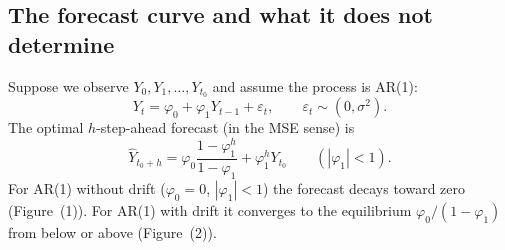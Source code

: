 \documentclass[a4paper,oneside,12pt]{extarticle}
\theoremstyle{plain}
\theoremstyle{definition}
\theoremstyle{remark}
\newcommand*{\ve}{\varepsilon}
\begin{document}
\subsection{The forecast curve and what it does not determine}

Suppose we observe $Y_0, Y_1, \ldots, Y_{t_0}$ and assume the process is
AR(1):
\[
  Y_t = \varphi_0 + \varphi_1 Y_{t-1} + \ve_t, \qquad \ve_t \sim (0, \sigma^2).
\]
The optimal $h$-step-ahead forecast (in the MSE sense) is
\begin{equation}
\label{eq:ar1_forecast}
\hat Y_{t_0+h} = \varphi_0 \frac{1-\varphi_1^h}{1-\varphi_1} + \varphi_1^h Y_{t_0}
  \qquad (|\varphi_1| < 1).
\end{equation}
For AR(1) without drift ($\varphi_0 = 0$, $|\varphi_1|<1$) the forecast
decays toward zero (Figure~(1)). For AR(1) with drift it converges to the
equilibrium $\varphi_0/(1-\varphi_1)$ from below or above (Figure~(2)).
\end{document}
